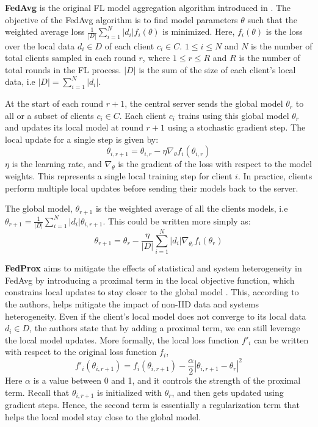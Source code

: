 \textbf{FedAvg} is the original FL model aggregation algorithm introduced in \cite{fl}.
The objective of the FedAvg algorithm is to find model parameters \(\theta\) such that the weighted average loss \( \frac{1}{|D|} \sum_{i=1}^{N} |d_i|f_i(\theta) \) is minimized. 
Here, \(f_i(\theta)\) is the loss over the local data \(d_i \in D\) of each client \( c_i \in C \). 
\(1 \leq i \leq N\) and \(N\) is the number of total clients sampled in each round \(r\), where \(1 \leq r \leq R\) and \(R\) is the number of total rounds in the FL process. 
\(|D|\) is the sum of the size of each client's local data, i.e \(|D|=\sum_{i=1}^{N}|d_i|\).

At the start of each round \(r + 1\), the central server sends the global model \(\theta_r\) to all or a subset of clients \(c_i \in C\). 
Each client \(c_i\) trains using this global model \(\theta_r\) and updates its local model at round \(r+1\) using a stochastic gradient step.
The local update for a single step is given by:
\[\theta_{i,r+1} =\theta_{i,r} - \eta \nabla_{\theta} f_i(\theta_{i,r})\]
\(\eta\) is the learning rate, and \(\nabla_{\theta}\) is the gradient of the loss with respect to the model weights. 
This represents a single local training step for client \(i\). 
In practice, clients perform multiple local updates before sending their models back to the server.

The global model, \(\theta_{r+1}\) is the weighted average of all the clients models, i.e \( \theta_{r+1} =  \frac{1}{|D|}  \sum_{i=1}^{N} |d_i|\theta_{i,r+1}\).
This could be written more simply as:
\[ \theta_{r+1} =\theta_r - \frac{\eta}{|D|} \sum_{i=1}^{N} |d_i| \nabla_{\theta_r}  f_i(\theta_{r}) \]

\textbf{FedProx} aims to mitigate the effects of statistical and system heterogeneity in FedAvg by introducing a proximal term in the local objective function, which constrains local updates to stay closer to the global model \cite{fedprox}. 
This, according to the authors, helps mitigate the impact of non-IID data and systems heterogeneity.
Even if the client's local model does not converge to its local data \(d_i \in D\), the authors state that by adding a proximal term, we can still leverage the local model updates.
More formally, the local loss function \(f'_i\) can be written with respect to the original loss function \(f_i\),
\[f'_i(\theta_{i,r+1}) = f_i(\theta_{i,r+1}) - \frac{\alpha}{2} | \theta_{i,r+1} -\theta_r |^2 \]
Here \(\alpha\) is a value between 0 and 1, and it controls the strength of the proximal term.
Recall that \(\theta_{i,r+1}\) is initialized with \(\theta_r\), and then gets updated using gradient steps. 
Hence, the second term is essentially a regularization term that helps the local model stay close to the global model.

